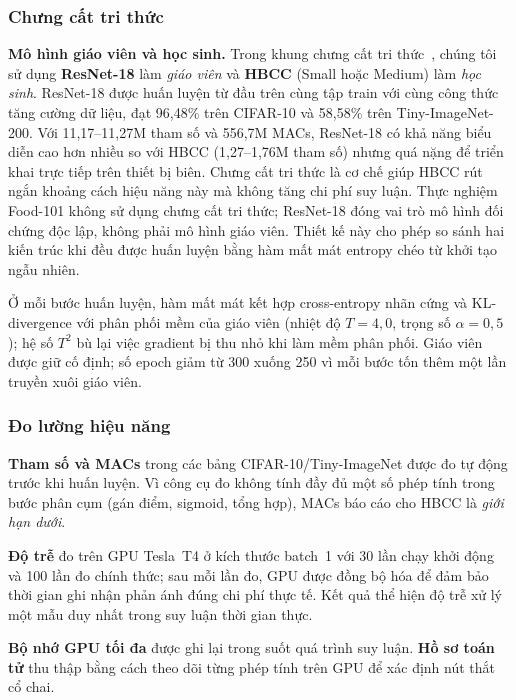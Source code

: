 \documentclass[conference]{IEEEtran}
\begin{document}
\subsubsection{Chưng cất tri thức}
\label{ssec:kd_setup}

\noindent\textbf{Mô hình giáo viên và học sinh.}
Trong khung chưng cất tri thức~\cite{Hinton2015Distillation}, chúng
tôi sử dụng \textbf{ResNet-18} làm \emph{giáo viên} và \textbf{HBCC}
(Small hoặc Medium) làm \emph{học sinh}. ResNet-18 được huấn luyện
từ đầu trên cùng tập train với cùng công thức tăng cường dữ liệu,
đạt 96,48\% trên CIFAR-10 và 58,58\% trên Tiny-ImageNet-200. Với
11,17--11,27M tham
số và 556,7M MACs, ResNet-18 có khả năng biểu diễn cao hơn nhiều so
với HBCC (1,27--1,76M tham số) nhưng quá nặng để triển khai trực
tiếp trên thiết bị biên. Chưng cất tri thức là cơ chế giúp HBCC rút
ngắn khoảng cách hiệu năng này mà không tăng chi phí suy luận.
Thực nghiệm Food-101 không sử dụng chưng cất tri thức; ResNet-18 đóng
vai trò mô hình đối chứng độc lập, không phải mô hình giáo viên. Thiết
kế này cho phép so sánh hai kiến trúc khi đều được huấn luyện bằng
hàm mất mát entropy chéo từ khởi tạo ngẫu nhiên.

Ở mỗi bước huấn luyện, hàm mất mát kết hợp cross-entropy nhãn cứng
và KL-divergence với phân phối mềm của giáo viên (nhiệt độ
$T{=}4{,}0$, trọng số $\alpha{=}0{,}5$); hệ số $T^2$ bù lại việc
gradient bị thu nhỏ khi làm mềm phân phối. Giáo viên được giữ cố
định; số epoch giảm từ 300 xuống 250 vì mỗi bước tốn thêm một lần
truyền xuôi giáo viên.

\subsubsection{Đo lường hiệu năng}

\textbf{Tham số và MACs} trong các bảng CIFAR-10/Tiny-ImageNet được
đo tự động trước khi huấn luyện. Vì công cụ đo không tính đầy đủ
một số phép tính trong bước phân cụm (gán điểm, sigmoid, tổng hợp),
MACs báo cáo cho HBCC là \emph{giới hạn dưới}.

\textbf{Độ trễ} đo trên GPU Tesla~T4 ở kích thước batch~1 với 30
lần chạy khởi động và 100 lần đo chính thức; sau mỗi lần đo, GPU
được đồng bộ hóa để đảm bảo thời gian ghi nhận phản ánh đúng chi
phí thực tế. Kết quả thể hiện độ trễ xử lý một mẫu duy nhất trong
suy luận thời gian thực.

\textbf{Bộ nhớ GPU tối đa} được ghi lại trong suốt quá trình suy
luận. \textbf{Hồ sơ toán tử} thu thập bằng cách theo dõi từng phép
tính trên GPU để xác định nút thắt cổ chai.
\end{document}
